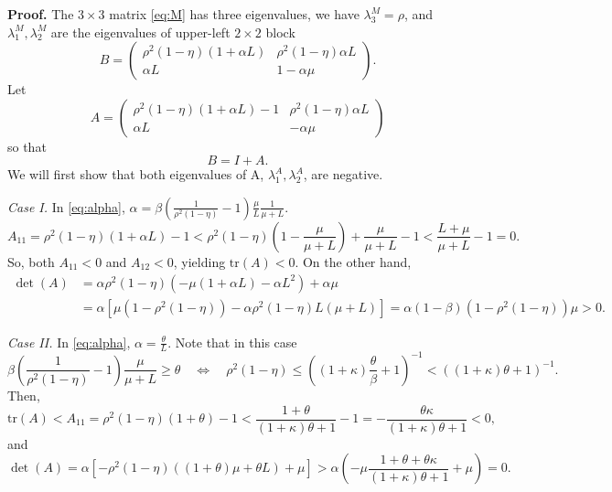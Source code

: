 \documentclass[11pt]{article}
\begin{document}
\noindent 
\textbf{Proof.}  The $3\times 3$ matrix \eqref{eq:M} has three eigenvalues, we have $\lambda^M_3=\rho$, and $\lambda^M_1,\lambda^M_2$ are the eigenvalues of upper-left $2\times 2$ block
\begin{equation}\label{eq:M}
 B = \begin{pmatrix} \rho^2(1-\eta)(1+\alpha  L)  &    \rho^2(1-\eta)\alpha L \\  
                   \alpha L  & 1-\alpha \mu \end{pmatrix}.                    
\end{equation} 
Let 
\[
A = \begin{pmatrix} \rho^2(1-\eta)(1+\alpha  L)-1 & \rho^2(1-\eta)\alpha L\\  
                   \alpha L  & -\alpha\mu \end{pmatrix}  
\]
so that
\[
 B = I + A.
\]
We will first show that both eigenvalues of A, $\lambda^A_1,\lambda^A_2$, are negative.  

\bigskip

\textit{Case I.} In \eqref{eq:alpha}, $\alpha = \beta\left(\frac{1}{\rho^2(1-\eta)}-1\right)\frac{\mu}{L}\frac{1}{\mu+L}$. 
\[
A_{11} = \rho^2(1-\eta)(1+\alpha  L)-1 < \rho^2(1-\eta)\left(1-\frac{\mu}{\mu+L}\right)+\frac{\mu}{\mu+L}-1 < \frac{L+\mu}{\mu+L} -1 = 0.
\]
So, both $A_{11}<0$ and $A_{12}<0$, yielding $\mbox{tr}(A)<0$.  On the other hand, 
\begin{align*}
 \det(A) &= \alpha\rho^2(1-\eta)(-\mu(1+\alpha L)-\alpha L^2)+\alpha\mu\\
 &= \alpha \left[ \mu\left(1-\rho^2(1-\eta)\right) - \alpha \rho^2(1-\eta) L (\mu+L) \right] = \alpha(1-\beta)(1-\rho^2(1-\eta))\mu >0.
\end{align*}

\textit{Case II.} In \eqref{eq:alpha}, $\alpha = \frac{\theta}{L}$.  Note that in this case
\begin{equation}\label{eq:step}
  \beta\left(\frac{1}{\rho^2(1-\eta)}-1\right)\frac{\mu}{\mu+L} \geq \theta \quad \Leftrightarrow \quad \rho^2(1-\eta) \leq \left((1+\kappa)\frac{\theta}{\beta} + 1\right)^{-1} < \left((1+\kappa)\theta + 1\right)^{-1}.
\end{equation}
Then,
\[
 \mbox{tr}(A) < A_{11} = \rho^2(1-\eta)(1+\theta)-1 < \frac{1+\theta}{(1+\kappa)\theta + 1} -1 = -\frac{\theta\kappa}{(1+\kappa)\theta + 1}<0,
\]
and
\[
 \det(A) = \alpha[-\rho^2(1-\eta)((1+\theta)\mu+\theta L)+\mu] > \alpha\left(-\mu\frac{1+\theta+\theta\kappa}{(1+\kappa)\theta + 1} + \mu\right) = 0.
\]
\end{document}
